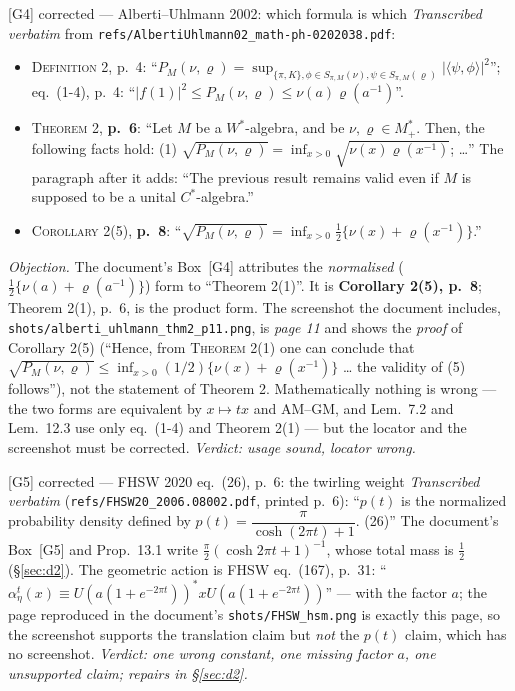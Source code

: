 \documentclass[11pt]{article}
\theoremstyle{definition}\newtheorem{example}[theorem]{Example}
\begin{document}
\begin{citedbox}{[G4] corrected --- Alberti--Uhlmann 2002: which formula is which}
\emph{Transcribed verbatim} from \texttt{refs/AlbertiUhlmann02\_math-ph-0202038.pdf}:
\begin{itemize}[leftmargin=1.4em,nosep]
\item \textsc{Definition 2}, p.~4: ``$P_M(\nu,\varrho)=\sup_{\{\pi,K\},
 \phi\in S_{\pi,M}(\nu),\psi\in S_{\pi,M}(\varrho)}|\langle\psi,\phi\rangle|^2$'';
 eq.~(1-4), p.~4: ``$|f(1)|^2\le P_M(\nu,\varrho)\le\nu(a)\varrho(a^{-1})$''.
\item \textsc{Theorem 2}, \textbf{p.~6}: ``Let $M$ be a $W^*$-algebra, and be
 $\nu,\varrho\in M^*_+$.  Then, the following facts hold: (1)
 $\sqrt{P_M(\nu,\varrho)}=\inf_{x>0}\sqrt{\nu(x)\varrho(x^{-1})}$; \dots''  The paragraph
 after it adds: ``The previous result remains valid even if $M$ is supposed to be a unital
 $C^*$-algebra.''
\item \textsc{Corollary 2}(5), \textbf{p.~8}: ``$\sqrt{P_M(\nu,\varrho)}
 =\inf_{x>0}\frac12\{\nu(x)+\varrho(x^{-1})\}$.''
\end{itemize}
\emph{Objection.}  The document's Box~[G4] attributes the \emph{normalised}
($\frac12\{\nu(a)+\varrho(a^{-1})\}$) form to ``Theorem 2(1)''.  It is
\textbf{Corollary 2(5), p.~8}; Theorem 2(1), p.~6, is the product form.  The screenshot the
document includes, \texttt{shots/alberti\_uhlmann\_thm2\_p11.png}, is \emph{page 11} and
shows the \emph{proof} of Corollary 2(5) (``Hence, from \textsc{Theorem} 2(1) one can
conclude that $\sqrt{P_M(\nu,\varrho)}\le\inf_{x>0}(1/2)\{\nu(x)+\varrho(x^{-1})\}$ \dots
the validity of (5) follows''), not the statement of Theorem 2.  Mathematically nothing is
wrong --- the two forms are equivalent by $x\mapsto tx$ and AM--GM, and Lem.~7.2 and
Lem.~12.3 use only eq.~(1-4) and Theorem 2(1) --- but the locator and the screenshot must
be corrected.  \emph{Verdict: usage sound, locator wrong.}

\smallskip\noindent{}
\end{citedbox}

\begin{citedbox}{[G5] corrected --- FHSW 2020 eq.~(26), p.~6: the twirling weight}
\emph{Transcribed verbatim} (\texttt{refs/FHSW20\_2006.08002.pdf}, printed p.~6):
``$p(t)$ is the normalized probability density defined by\quad
$p(t)=\dfrac{\pi}{\cosh(2\pi t)+1}$. \hfill (26)''
The document's Box~[G5] and Prop.~13.1 write $\frac\pi2(\cosh2\pi t+1)^{-1}$, whose total
mass is $\frac12$ (\S\ref{sec:d2}).  The geometric action is FHSW eq.~(167), p.~31:
``$\alpha^t_\eta(x)\equiv U(a(1+e^{-2\pi t}))^*xU(a(1+e^{-2\pi t}))$'' --- with the factor
$a$; the page reproduced in the document's \texttt{shots/FHSW\_hsm.png} is exactly this
page, so the screenshot supports the translation claim but \emph{not} the $p(t)$ claim,
which has no screenshot.  \emph{Verdict: one wrong constant, one missing factor $a$, one
unsupported claim; repairs in \S\ref{sec:d2}.}

\smallskip\noindent{}
\end{citedbox}
\end{document}
